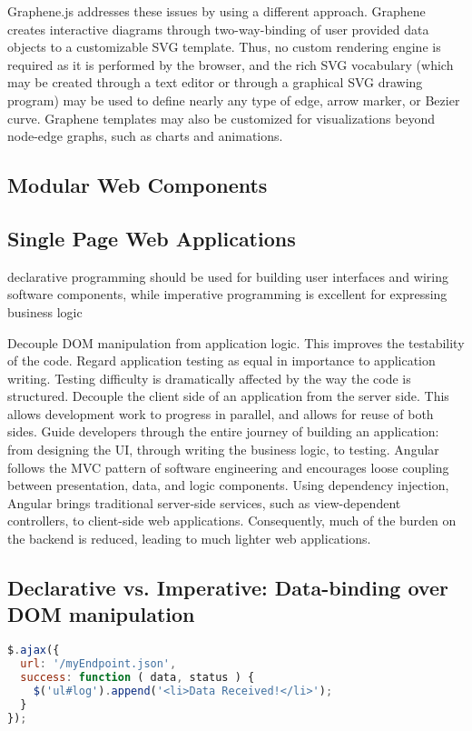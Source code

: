 Graphene.js addresses these issues by using a different approach. 
Graphene creates interactive diagrams through two-way-binding of user provided data objects to a customizable SVG template.
Thus, no custom rendering engine is required as it is performed by the browser, and the rich SVG vocabulary (which may be created through a text editor or through a graphical SVG drawing program) may be used to define nearly any type of edge, arrow marker, or Bezier curve.
Graphene templates may also be customized for visualizations beyond node-edge graphs, such as charts and animations.

\subsection{Modular Web Components}

\subsection{Single Page Web Applications}

declarative programming should be used for building user interfaces and wiring software components, while imperative programming is excellent for expressing business logic


Decouple DOM manipulation from application logic. This improves the testability of the code. Regard application testing as equal in importance to application writing. Testing difficulty is dramatically affected by the way the code is structured.
Decouple the client side of an application from the server side. This allows development work to progress in parallel, and allows for reuse of both sides.
Guide developers through the entire journey of building an application: from designing the UI, through writing the business logic, to testing.
Angular follows the MVC pattern of software engineering and encourages loose coupling between presentation, data, and logic components. Using dependency injection, Angular brings traditional server-side services, such as view-dependent controllers, to client-side web applications. Consequently, much of the burden on the backend is reduced, leading to much lighter web applications.

\subsection{Declarative vs. Imperative: Data-binding over DOM manipulation}

\begin{lstlisting}[language=JavaScript]
$.ajax({
  url: '/myEndpoint.json',
  success: function ( data, status ) {
    $('ul#log').append('<li>Data Received!</li>');
  }
});
\end{lstlisting}

